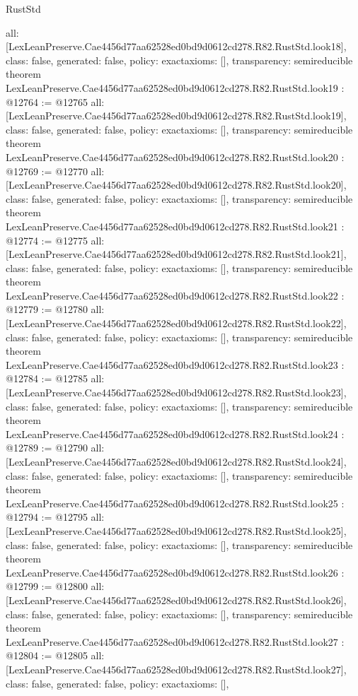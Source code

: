 \begin{lexlean}{RustStd}
\begin{coremodule}
{  all: [LexLeanPreserve.Cae4456d77aa62528ed0bd9d0612cd278.R82.RustStd.look18],
  class: false,
  generated: false,
  policy: exact{axioms: []},
  transparency: semireducible
}
theorem LexLeanPreserve.Cae4456d77aa62528ed0bd9d0612cd278.R82.RustStd.look19 : @12764 := @12765 {
  all: [LexLeanPreserve.Cae4456d77aa62528ed0bd9d0612cd278.R82.RustStd.look19],
  class: false,
  generated: false,
  policy: exact{axioms: []},
  transparency: semireducible
}
theorem LexLeanPreserve.Cae4456d77aa62528ed0bd9d0612cd278.R82.RustStd.look20 : @12769 := @12770 {
  all: [LexLeanPreserve.Cae4456d77aa62528ed0bd9d0612cd278.R82.RustStd.look20],
  class: false,
  generated: false,
  policy: exact{axioms: []},
  transparency: semireducible
}
theorem LexLeanPreserve.Cae4456d77aa62528ed0bd9d0612cd278.R82.RustStd.look21 : @12774 := @12775 {
  all: [LexLeanPreserve.Cae4456d77aa62528ed0bd9d0612cd278.R82.RustStd.look21],
  class: false,
  generated: false,
  policy: exact{axioms: []},
  transparency: semireducible
}
theorem LexLeanPreserve.Cae4456d77aa62528ed0bd9d0612cd278.R82.RustStd.look22 : @12779 := @12780 {
  all: [LexLeanPreserve.Cae4456d77aa62528ed0bd9d0612cd278.R82.RustStd.look22],
  class: false,
  generated: false,
  policy: exact{axioms: []},
  transparency: semireducible
}
theorem LexLeanPreserve.Cae4456d77aa62528ed0bd9d0612cd278.R82.RustStd.look23 : @12784 := @12785 {
  all: [LexLeanPreserve.Cae4456d77aa62528ed0bd9d0612cd278.R82.RustStd.look23],
  class: false,
  generated: false,
  policy: exact{axioms: []},
  transparency: semireducible
}
theorem LexLeanPreserve.Cae4456d77aa62528ed0bd9d0612cd278.R82.RustStd.look24 : @12789 := @12790 {
  all: [LexLeanPreserve.Cae4456d77aa62528ed0bd9d0612cd278.R82.RustStd.look24],
  class: false,
  generated: false,
  policy: exact{axioms: []},
  transparency: semireducible
}
theorem LexLeanPreserve.Cae4456d77aa62528ed0bd9d0612cd278.R82.RustStd.look25 : @12794 := @12795 {
  all: [LexLeanPreserve.Cae4456d77aa62528ed0bd9d0612cd278.R82.RustStd.look25],
  class: false,
  generated: false,
  policy: exact{axioms: []},
  transparency: semireducible
}
theorem LexLeanPreserve.Cae4456d77aa62528ed0bd9d0612cd278.R82.RustStd.look26 : @12799 := @12800 {
  all: [LexLeanPreserve.Cae4456d77aa62528ed0bd9d0612cd278.R82.RustStd.look26],
  class: false,
  generated: false,
  policy: exact{axioms: []},
  transparency: semireducible
}
theorem LexLeanPreserve.Cae4456d77aa62528ed0bd9d0612cd278.R82.RustStd.look27 : @12804 := @12805 {
  all: [LexLeanPreserve.Cae4456d77aa62528ed0bd9d0612cd278.R82.RustStd.look27],
  class: false,
  generated: false,
  policy: exact{axioms: []},
}
\end{coremodule}
\end{lexlean}
